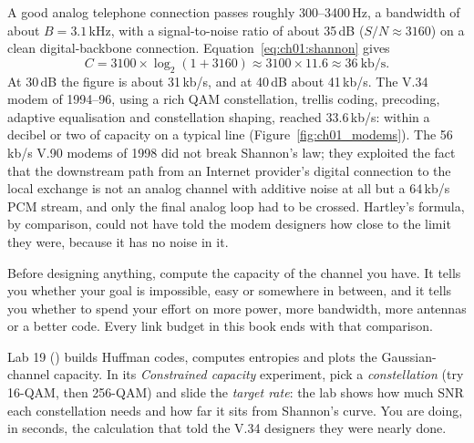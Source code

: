 \begin{worked}
A good analog telephone connection passes roughly 300--3400\,Hz, a bandwidth of about $B=3.1$\,kHz,
with a signal-to-noise ratio of about 35\,dB ($S/N\approx3160$) on a clean digital-backbone connection.
Equation~\eqref{eq:ch01:shannon} gives
\[
C = 3100\times\log_2(1+3160)\approx3100\times11.6\approx36\ \mathrm{kb/s}.
\]
At 30\,dB the figure is about 31\,kb/s, and at 40\,dB about 41\,kb/s. The V.34 modem of 1994--96,
using a rich QAM constellation, trellis coding, precoding, adaptive equalisation and constellation
shaping, reached 33.6\,kb/s: within a decibel or two of capacity on a typical line
(Figure~\ref{fig:ch01_modems}). The 56\,kb/s V.90 modems of 1998 did not break Shannon's law; they
exploited the fact that the downstream path from an Internet provider's digital connection to the local
exchange is not an analog channel with additive noise at all but a 64\,kb/s PCM stream, and only the
final analog loop had to be crossed. Hartley's formula, by comparison, could not have told the modem
designers how close to the limit they were, because it has no noise in it.
\end{worked}


\begin{keyidea}
Before designing anything, compute the capacity of the channel you have. It tells you whether your goal
is impossible, easy or somewhere in between, and it tells you whether to spend your effort on more power,
more bandwidth, more antennas or a better code. Every link budget in this book ends with that comparison.
\end{keyidea}

\begin{tryit}
Lab 19 () builds Huffman codes, computes entropies and plots the
Gaussian-channel capacity. In its \emph{Constrained capacity} experiment, pick a \emph{constellation} (try 16-QAM,
then 256-QAM) and slide the \emph{target rate}: the lab shows how much SNR each constellation needs
and how far it sits from Shannon's curve. You are doing, in seconds, the calculation that told the V.34
designers they were nearly done.
\end{tryit}

